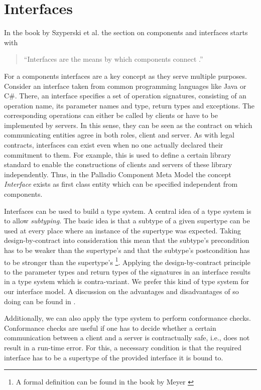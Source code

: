 \newpage
\section{Interfaces} %

In the book by Szyperski et al. the section on components and interfaces starts with

\begin{quote}
"`Interfaces are the means by which components connect \cite[p. 50]{szyperski2002a}."'
\end{quote}

For a components interfaces are a key concept as they serve multiple purposes. Consider an interface taken from common programming languages like Java or C\#. There, an interface specifies a set of operation signatures, consisting of an operation name, its parameter names and type, return types and exceptions. The corresponding operations can either be called by clients or have to be implemented by servers. In this sense, they can be seen as the contract on which communicating entities agree in both roles, client and server. As with legal contracts, interfaces can exist even when no one actually declared their commitment to them. For example, this is used to define a certain library standard to enable the constructions of clients and servers of these library independently. Thus, in the Palladio Component Meta Model the concept \emph{Interface} exists as first class entity which can be specified independent from components.

Interfaces can be used to build a type system. A central idea of a type system is to allow \emph{subtyping}. The basic idea is that a subtype of a given supertype can be used at every place where an instance of the supertype was expected. Taking design-by-contract \cite{meyer1997a} into consideration this mean that the subtype's precondition has to be weaker than the supertype's and that the subtype's postcondition has to be stronger than the supertype's \footnote{A formal definition can be found in the book by Meyer \cite{meyer1997a}}. Applying the design-by-contract principle to the parameter types and return types of the signatures in an interface results in a type system which is contra-variant. We prefer this kind of type system for our interface model. A discussion on the advantages and disadvantages of so doing can be found in \cite[p. 628ff]{meyer1997a}.

Additionally, we can also apply the type system to perform conformance checks. Conformance checks are useful if one has to decide whether a certain communication between a client and a server is contractually safe, i.e., does not result in a run-time error. For this, a necessary condition is that the required interface has to be a supertype of the provided interface it is bound to. 

